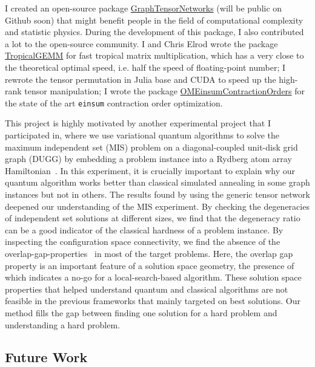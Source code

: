 \documentclass[a4paper]{article}
\newcommand{\<}{\langle}
\renewcommand{\>}{\rangle}
\begin{document}
I created an open-source package \href{https://github.com/Happy-Diode/GraphTensorNetworks.jl}{GraphTensorNetworks} (will be public on Github soon) that might benefit people in the field of computational complexity and statistic physics.
During the development of this package, I also contributed a lot to the open-source community. I and Chris Elrod wrote the package \href{https://github.com/TensorBFS/TropicalGEMM.jl/}{TropicalGEMM} for fast tropical matrix multiplication, which has a very close to the theoretical optimal speed, i.e. half the speed of floating-point number; I rewrote the tensor permutation in Julia base and CUDA to speed up the high-rank tensor manipulation; I wrote the package \href{https://github.com/TensorBFS/OMEinsumContractionOrders.jl}{OMEinsumContractionOrders} for the state of the art \texttt{einsum} contraction order optimization.


This project is highly motivated by another experimental project that I participated in, where we use variational quantum algorithms to solve the maximum independent set (MIS) problem on a diagonal-coupled unit-disk grid graph (DUGG) by embedding a problem instance into a Rydberg atom array Hamiltonian~\cite{Ebadi2022}.
In this experiment, it is crucially important to explain why our quantum algorithm works better than classical simulated annealing in some graph instances but not in others.
The results found by using the generic tensor network deepened our understanding of the MIS experiment.
By checking the degeneracies of independent set solutions at different sizes, we find that the degeneracy ratio can be a good indicator of the classical hardness of a problem instance.
By inspecting the configuration space connectivity, we find the absence of the overlap-gap-properties~\cite{Gamarnik2021} in most of the target problems.
Here, the overlap gap property is an important feature of a solution space geometry, the presence of which indicates a no-go for a local-search-based algorithm.
These solution space properties that helped understand quantum and classical algorithms are not feasible in the previous frameworks that mainly targeted on best solutions. Our method fills the gap between finding one solution for a hard problem and understanding a hard problem.

\subsection{Future Work}
\end{document}

